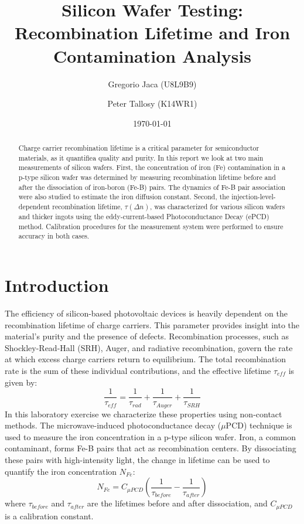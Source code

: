 \documentclass[12pt,a4paper]{article}
\title{Silicon Wafer Testing: Recombination Lifetime and Iron Contamination Analysis}
\author{Gregorio Jaca (U8L9B9) \and Peter Tallosy (K14WR1)}
\date{\today}
\begin{document}
\maketitle

\begin{abstract}
Charge carrier recombination lifetime is a critical parameter for semiconductor materials, as it quantifiea quality and purity. In this report we look at two main measurements of silicon wafers. First, the concentration of iron (Fe) contamination in a p-type silicon wafer was determined by measuring recombination lifetime before and after the dissociation of iron-boron (Fe-B) pairs. The dynamics of Fe-B pair association were also studied to estimate the iron diffusion constant. Second, the injection-level-dependent recombination lifetime, $\tau(\Delta n)$, was characterized for various silicon wafers and thicker ingots using the eddy-current-based Photoconductance Decay (ePCD) method. Calibration procedures for the measurement system were performed to ensure accuracy in both cases.
\end{abstract}

\section{Introduction}

The efficiency of silicon-based photovoltaic devices is heavily dependent on the recombination lifetime of charge carriers. This parameter provides insight into the material's purity and the presence of defects. Recombination processes, such as Shockley-Read-Hall (SRH), Auger, and radiative recombination, govern the rate at which excess charge carriers return to equilibrium. The total recombination rate is the sum of these individual contributions, and the effective lifetime $\tau_{eff}$ is given by:
\begin{equation}
\frac{1}{\tau_{eff}} = \frac{1}{\tau_{rad}} + \frac{1}{\tau_{Auger}} + \frac{1}{\tau_{SRH}}
\end{equation}
In this laboratory exercise we characterize these properties using non-contact methods. The microwave-induced photoconductance decay ($\mu$PCD) technique is used to measure the iron concentration in a p-type silicon wafer. Iron, a common contaminant, forms Fe-B pairs that act as recombination centers. By dissociating these pairs with high-intensity light, the change in lifetime can be used to quantify the iron concentration $N_{Fe}$:
\begin{equation}
N_{Fe} = C_{\mu PCD} \left( \frac{1}{\tau_{before}} - \frac{1}{\tau_{after}} \right)
\end{equation}
where $\tau_{before}$ and $\tau_{after}$ are the lifetimes before and after dissociation, and $C_{\mu PCD}$ is a calibration constant.
\end{document}
